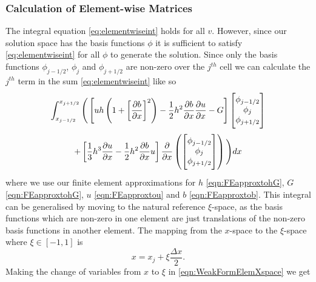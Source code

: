 \subsubsection{Calculation of Element-wise Matrices}
The integral equation \eqref{eq:elementwiseint} holds for all $v$. However, since our solution space has the basis functions $\phi$ it is sufficient to satisfy \eqref{eq:elementwiseint} for all $\phi$ to generate the solution. Since only the basis functions $\phi_{j-1/2}$, $\phi_{j}$ and $\phi_{j+1/2}$ are non-zero over the $j^{th}$ cell we can calculate the $j^{th}$ term in the sum \eqref{eq:elementwiseint} like so
\begin{multline}
\int_{x_{j-1/2} }^{{x_{j+1/2}}} \Bigg(  \left[ uh \left(1  +  \left[\frac{\partial b}{\partial x}\right]^2 \right)  - \frac{1}{2}h^2\frac{\partial b}{\partial x}  \frac{\partial u }{\partial x}  -  G \right] \begin{bmatrix} \TM
\phi_{j-1/2}\\\phi_j \\\phi_{j+1/2} \BM\end{bmatrix}   \\ +  \left[ \frac{1}{3}h^3  \frac{\partial {u}}{\partial x}    -     \frac{1}{2}h^2\frac{\partial b}{\partial x} u    \right] \frac{\partial}{\partial x}\left(\begin{bmatrix} \TM
\phi_{j-1/2}\\\phi_j \\\phi_{j+1/2}  \BM
\end{bmatrix} \right) \Bigg)dx
\label{eqn:WeakFormElemXspace}
\end{multline}
where we use our finite element approximations for $h$ \eqref{eqn:FEapproxtohG}, $G$ \eqref{eqn:FEapproxtohG}, $u$ \eqref{eqn:FEapproxtou} and $b$ \eqref{eqn:FEapproxtob}. This integral can be generalised by moving to the natural reference $\xi$-space, as the basis functions which are non-zero in one element are just translations of the non-zero basis functions in another element. The mapping from the $x$-space to the $\xi$-space where $\xi \in \left[-1,1\right]$ is
\begin{equation*}
x = x_j + \xi \frac{\Delta x}{2}.
\end{equation*}
Making the change of variables from $x$ to $\xi$ in \eqref{eqn:WeakFormElemXspace} we get
